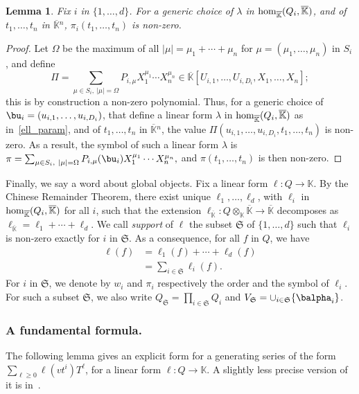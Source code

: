 \documentclass[12pt]{article}
\def\K {\ensuremath{\mathbb{K}}}
\def\Kbar {{\ensuremath{\overline{\mathbb{K}}}}}
\newtheorem{Lemma}{Lemma}
\begin{document}
\begin{Lemma}\label{lemma:symbol0}
  Fix $i$ in $\{1,\dots,d\}$. For a generic choice of $\lambda$ in ${\rm
  hom}_\Kbar(Q_i,\Kbar)$, and of $t_1,\dots,t_n$ in $\Kbar{}^n$,
  $\pi_i(t_1,\dots,t_n)$ is non-zero.
\end{Lemma}
\begin{proof}
  Let $\Omega$ be the maximum of all $|\mu|=\mu_1+\cdots+\mu_n$ for
  $\mu=(\mu_1,\dots,\mu_n)$ in $S_i$, and define 
  $$\Pi =\sum_{\mu \in S_i,\ |\mu|=\Omega}P_{i,\mu} X_1^{\mu_1} \cdots
  X_n^{\mu_n} \in \Kbar[U_{i,1},\dots,U_{i,D_i},X_1,\dots,X_n];$$ this
  is by construction a non-zero polynomial.  Thus, for a generic
  choice of $\bu_i=(u_{i,1},\dots,u_{i,D_i})$, that define a linear form
  $\lambda$ in ${\rm hom}_\Kbar(Q_i,\Kbar)$ as in~\eqref{ell_param},
  and of $t_1,\dots,t_n$ in $\Kbar{}^n$, the value
  $\Pi(u_{i,1},\dots,u_{i,D_i},t_1,\dots,t_n)$ is non-zero. As a
  result, the symbol of such a linear form $\lambda$ is $\pi =\sum_{\mu \in
    S_i,\ |\mu|=\Omega}P_{i,\mu}(\bu_i) X_1^{\mu_1} \cdots X_n^{\mu_n},$
  and $\pi(t_1,\dots,t_n)$ is then non-zero.
\end{proof}



Finally, we say a word about global objects.  Fix a linear form $\ell:
Q \to \K$. By the Chinese Remainder Theorem, there exist unique
$\ell_1,\dots,\ell_d$, with $\ell_i$ in ${\rm hom}_\Kbar(Q_i,\Kbar)$
for all $i$, such that the extension $\ell_\Kbar: Q\otimes_\K \Kbar
\to \Kbar$ decomposes as $\ell_\Kbar = \ell_1 + \cdots + \ell_d$. We
call {\em support} of $\ell$ the subset $\mathfrak{S}$ of
$\{1,\dots,d\}$ such that $\ell_i$ is non-zero exactly for $i$ in
$\mathfrak{S}$.  As a consequence, for all $f$ in $Q$, we have
\begin{align}\label{eq:fui}
\ell(f) &= \ell_1(f) + \cdots + \ell_d(f)\nonumber\\
&=  \sum_{i \in \mathfrak{S}} \ell_i(f).
\end{align}
For $i$ in $\mathfrak{S}$, we denote by $w_i$ and $\pi_i$ respectively
the order and the symbol of $\ell_i$. For such a subset
$\mathfrak{S}$, we also write $Q_\mathfrak{S}=\prod_{i \in
  \mathfrak{S}} Q_i$ and $V_\mathfrak{S}=\cup_{i \in \mathfrak{S}}
\{\balpha_i\}$.


\subsubsection{A fundamental formula.}  The following lemma 
gives an explicit form for a generating series of the form $\sum_{\ell
  \ge 0} \ell(v t^i)T^\ell$, for a linear form $\ell:Q \to \K$. A
slightly less precise version of it is in~\cite{BoSaSc03}.
\end{document}
